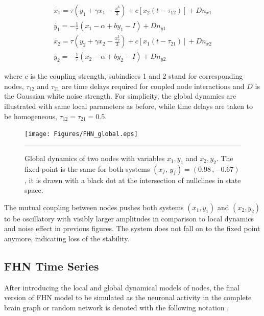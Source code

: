 \begin{subequations}
 \begin{align}\dot{x_1} = \tau (y_1 + \gamma x_1 - \frac{x^3}{3}) + c [x_2(t-\tau_{12})] +Dn_{x1} \label{eqn: frobenius 14}\\  \dot{y_1} = -\frac{1}{\tau} (x_1 - \alpha + b y_1 - I )+ Dn_{y1} \label{eqn: frobenius 15} \\ \dot{x_2} = \tau (y_2 + \gamma x_2 - \frac{x_2^3}{3}) + c [x_1(t-\tau_{21})] + Dn_{x2} \label{eqn: frobenius 16} \\  \dot{y_2} = -\frac{1}{\tau} (x_2 - \alpha + b y_2 - I ) + Dn_{y2}\end{align} 
\end{subequations}
 
where $c$ is the coupling strength, subindices 1 and 2 stand for corresponding nodes, $\tau_{12}$ and $\tau_{21}$ are time delays required for coupled node interactions and $D$ is the Gaussian white noise strength. For simplicity, the global dynamics are illustrated with same local parameters as before, while time delays are taken to be homogeneous, $\tau_{12}=\tau_{21}=0.5$.

\begin{figure}[htbp]
  \centering
	\texttt{[image: Figures/FHN\_global.eps]}
 
    \rule{35em}{0.5pt}
    \caption[FHN Global]{Global dynamics of two nodes with variables $x_1,y_1$ and  $x_2,y_2$. The fixed point is the same for both systems $(x_f, \, y_f) = (0.98 \, , -0.67 )$, it is drawn with a black dot at the intersection of nullclines in state space.}
  \label{fig:FHN Global}	
\end{figure}

The mutual coupling between nodes pushes both systems $(x_1,y_1)$ and $(x_2,y_2)$ to be oscillatory with visibly larger amplitudes in comparison to local dynamics and noise effect in previous figures. The system does not fall on to the fixed point anymore, indicating loss of the stability. 

\subsection{FHN Time Series}

After introducing the local and global dynamical models of nodes, the final version of FHN model to be simulated as the neuronal activity in the complete brain graph or random network is denoted with the following notation \citep{VUK13},  
 
